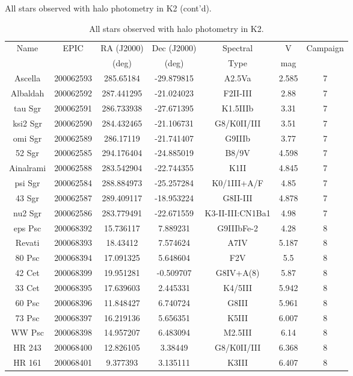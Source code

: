 \begin{table*}
\caption{All stars observed with halo photometry in K2 (cont'd).}
\caption{All stars observed with halo photometry in K2.\label{table_all}}
\begin{tabular}{ccccccc}
\hline \hline
Name & EPIC & RA (J2000) & Dec (J2000) & Spectral & V & Campaign \\
 &  & (deg) & (deg) & Type & mag &  \\
\hline
Ascella & 200062593 & 285.65184 & -29.879815 & A2.5Va & 2.585 & 7 \\
Albaldah & 200062592 & 287.441295 & -21.024023 & F2II-III & 2.88 & 7 \\
tau Sgr & 200062591 & 286.733938 & -27.671395 & K1.5IIIb & 3.31 & 7 \\
ksi2 Sgr & 200062590 & 284.432465 & -21.106731 & G8/K0II/III & 3.51 & 7 \\
omi Sgr & 200062589 & 286.17119 & -21.741407 & G9IIIb & 3.77 & 7 \\
52 Sgr & 200062585 & 294.176404 & -24.885019 & B8/9V & 4.598 & 7 \\
Ainalrami & 200062588 & 283.542904 & -22.744355 & K1II & 4.845 & 7 \\
psi Sgr & 200062584 & 288.884973 & -25.257284 & K0/1III+A/F & 4.85 & 7 \\
43 Sgr & 200062587 & 289.409117 & -18.953224 & G8II-III & 4.878 & 7 \\
nu2 Sgr & 200062586 & 283.779491 & -22.671559 & K3-II-III:CN1Ba1 & 4.98 & 7 \\
eps Psc & 200068392 & 15.736117 & 7.889231 & G9IIIbFe-2 & 4.28 & 8 \\
Revati & 200068393 & 18.43412 & 7.574624 & A7IV & 5.187 & 8 \\
80 Psc & 200068394 & 17.091325 & 5.648604 & F2V & 5.5 & 8 \\
42 Cet & 200068399 & 19.951281 & -0.509707 & G8IV+A(8) & 5.87 & 8 \\
33 Cet & 200068395 & 17.639603 & 2.445331 & K4/5III & 5.942 & 8 \\
60 Psc & 200068396 & 11.848427 & 6.740724 & G8III & 5.961 & 8 \\
73 Psc & 200068397 & 16.219136 & 5.656351 & K5III & 6.007 & 8 \\
WW Psc & 200068398 & 14.957207 & 6.483094 & M2.5III & 6.14 & 8 \\
HR 243 & 200068400 & 12.826105 & 3.38449 & G8/K0II/III & 6.368 & 8 \\
HR 161 & 200068401 & 9.377393 & 3.135111 & K3III & 6.407 & 8 \\

\end{tabular}
\end{table*}
